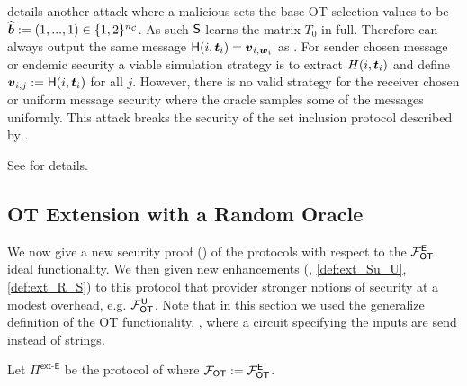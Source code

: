  details another attack where a malicious \send sets the base OT selection values to be $\widehat\bb:=(1,...,1)\in \{1,2\}^\nc$. As such $\send$ learns the matrix $T_0$ in full. Therefore \send can always output the same message $\H(i, \tt_i)=\vv_{i,\ww_i}$ as \rec. For sender chosen message or endemic security a viable simulation strategy is to extract $H(i, \tt_i)$ and define $\vv_{i,j}:=\H(i, \tt_i)$ for all $j$. However, there is no valid strategy for the receiver chosen or uniform message security where the oracle samples some of the messages uniformly. This attack breaks the security of the set inclusion protocol described by \cite[Figure 5]{RSA:OrrOrsSch17}.
\iffullversion

\else
See  for details.
\fi





\subsection{OT Extension with a Random Oracle}\label{sec:extSec}

We now give a new security proof () of the \cite{C:KelOrsSch15,RSA:OrrOrsSch17} protocols with respect to the $\OOT^\E$ ideal functionality. We then given new enhancements (, \ref{def:ext_Su_U}, \ref{def:ext_R_S}) to this protocol that provider stronger notions of security at a modest overhead, e.g. $\OOT^\U$. Note that in this section we used the generalize definition of the OT functionality, , where a circuit specifying the inputs are send instead of strings.


\begin{definition}\label{def:ext_E_E}
	Let $\Pi^{\textsf{ext-E}}$ be the protocol of  where $\OOT:=\OOT^\E$.
\end{definition}



